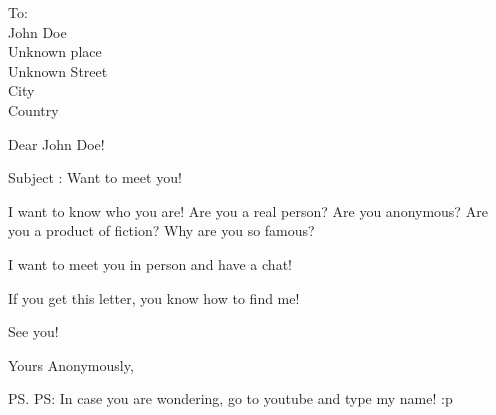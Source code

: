 \documentclass[10pt, a4paper]{letter}
\date{31 August 2001, Bangalore}
\begin{document}
\begin{letter}{To: \\ John Doe \\ Unknown place \\ Unknown Street \\ City \\ Country}

\opening{Dear John Doe!}

\begin{center}
Subject : Want to meet you!
\end{center}

I want to know who you are! Are you a real person? Are you anonymous? Are you a product of fiction? Why are you so famous?

I want to meet you in person and have a chat!

If you get this letter, you know how to find me!

See you!

\closing{Yours Anonymously,}

\ps{PS: In case you are wondering, go to youtube and type my name! :p}



\end{letter}
\end{document}

